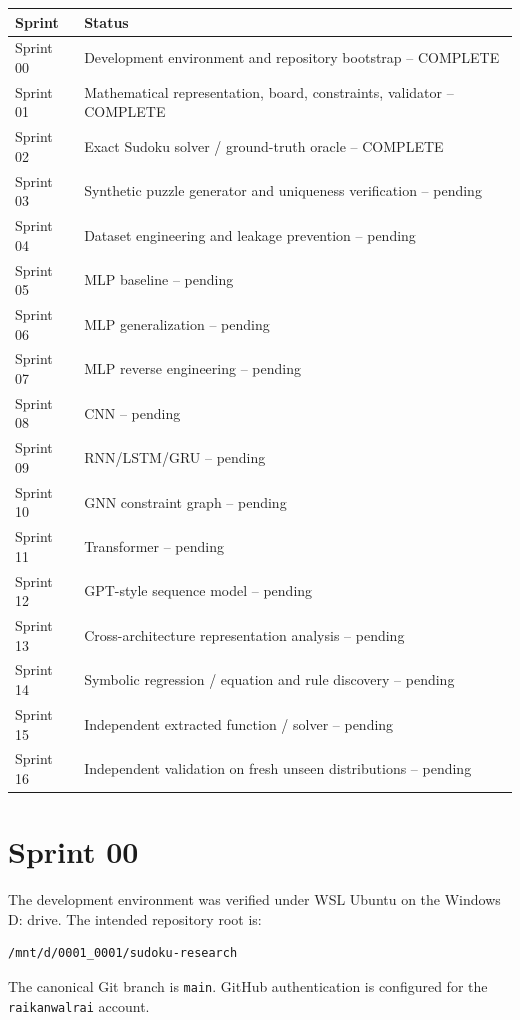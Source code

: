 \documentclass[11pt,a4paper]{article}
\begin{document}
\begin{longtable}{p{}p{}}
\textbf{Sprint} & \textbf{Status} \\
\hline
Sprint 00 & Development environment and repository bootstrap -- COMPLETE \\
Sprint 01 & Mathematical representation, board, constraints, validator -- COMPLETE \\
Sprint 02 & Exact Sudoku solver / ground-truth oracle -- COMPLETE \\
Sprint 03 & Synthetic puzzle generator and uniqueness verification -- pending \\
Sprint 04 & Dataset engineering and leakage prevention -- pending \\
Sprint 05 & MLP baseline -- pending \\
Sprint 06 & MLP generalization -- pending \\
Sprint 07 & MLP reverse engineering -- pending \\
Sprint 08 & CNN -- pending \\
Sprint 09 & RNN/LSTM/GRU -- pending \\
Sprint 10 & GNN constraint graph -- pending \\
Sprint 11 & Transformer -- pending \\
Sprint 12 & GPT-style sequence model -- pending \\
Sprint 13 & Cross-architecture representation analysis -- pending \\
Sprint 14 & Symbolic regression / equation and rule discovery -- pending \\
Sprint 15 & Independent extracted function / solver -- pending \\
Sprint 16 & Independent validation on fresh unseen distributions -- pending \\
\end{longtable}

\section{Sprint 00}

The development environment was verified under WSL Ubuntu on the Windows
D: drive. The intended repository root is:

\begin{verbatim}
/mnt/d/0001_0001/sudoku-research
\end{verbatim}

The canonical Git branch is \texttt{main}. GitHub authentication is configured
for the \texttt{raikanwalrai} account.
\end{document}
